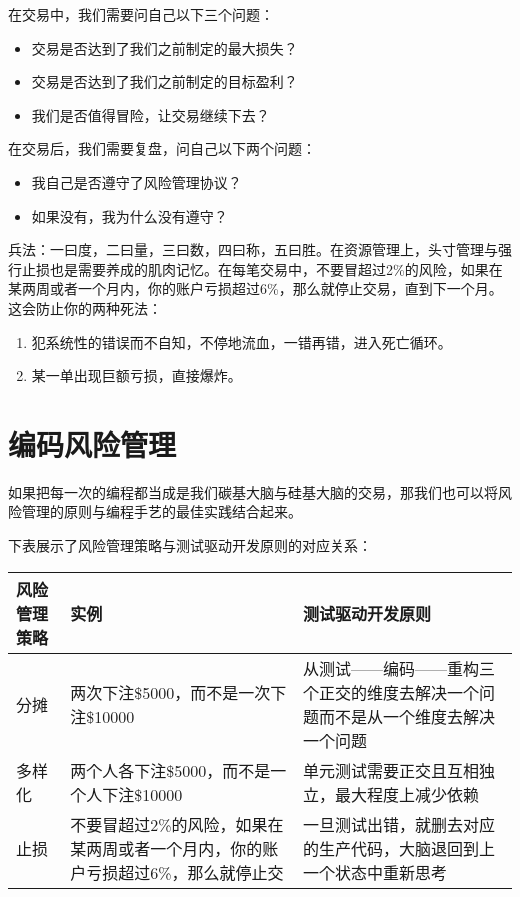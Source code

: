 \documentclass[
  oneside]{book}
\providecommand{\tightlist}{%
  \setlength{\itemsep}{0pt}\setlength{\parskip}{0pt}}
\begin{document}
在交易中，我们需要问自己以下三个问题：

\begin{itemize}
\tightlist
\item
  交易是否达到了我们之前制定的最大损失？
\item
  交易是否达到了我们之前制定的目标盈利？
\item
  我们是否值得冒险，让交易继续下去？
\end{itemize}

在交易后，我们需要复盘，问自己以下两个问题：

\begin{itemize}
\tightlist
\item
  我自己是否遵守了风险管理协议？
\item
  如果没有，我为什么没有遵守？
\end{itemize}

兵法：一曰度，二曰量，三曰数，四曰称，五曰胜。在资源管理上，头寸管理与强行止损也是需要养成的肌肉记忆。在每笔交易中，不要冒超过2\%的风险，如果在某两周或者一个月内，你的账户亏损超过6\%，那么就停止交易，直到下一个月。这会防止你的两种死法：

\begin{enumerate}
\def\labelenumi{\arabic{enumi}.}
\tightlist
\item
  犯系统性的错误而不自知，不停地流血，一错再错，进入死亡循环。
\item
  某一单出现巨额亏损，直接爆炸。
\end{enumerate}

\hypertarget{ux7f16ux7801ux98ceux9669ux7ba1ux7406}{%
\section{编码风险管理}\label{ux7f16ux7801ux98ceux9669ux7ba1ux7406}}

如果把每一次的编程都当成是我们碳基大脑与硅基大脑的交易，那我们也可以将风险管理的原则与编程手艺的最佳实践结合起来。

下表展示了风险管理策略与测试驱动开发原则的对应关系：

\begin{longtable}[]{@{}
  >{\raggedright\arraybackslash}p{}
  >{\raggedright\arraybackslash}p{}
  >{\raggedright\arraybackslash}p{}@{}}
\toprule
风险管理策略 & 实例 & 测试驱动开发原则 \\
\midrule
\endhead
分摊 & 两次下注\$5000，而不是一次下注\$10000 & 从测试------编码------重构三个正交的维度去解决一个问题而不是从一个维度去解决一个问题 \\
多样化 & 两个人各下注\$5000，而不是一个人下注\$10000 & 单元测试需要正交且互相独立，最大程度上减少依赖 \\
止损 & 不要冒超过2\%的风险，如果在某两周或者一个月内，你的账户亏损超过6\%，那么就停止交 & 一旦测试出错，就删去对应的生产代码，大脑退回到上一个状态中重新思考 \\
\bottomrule
\end{longtable}
\end{document}
